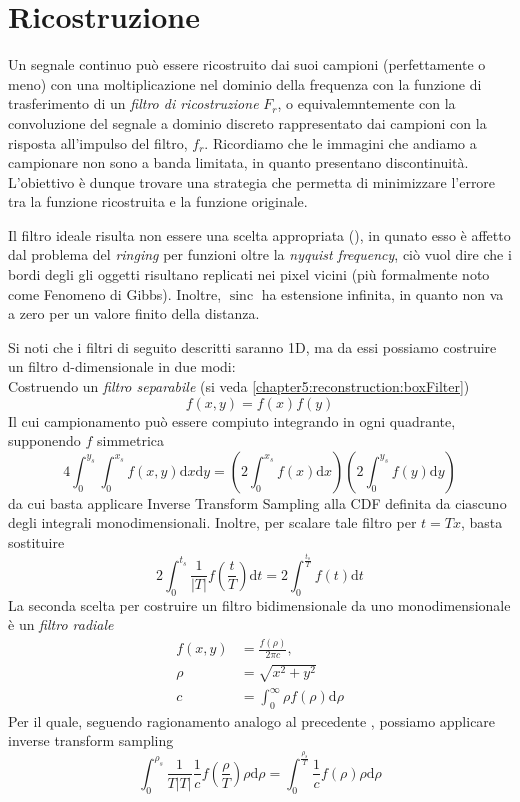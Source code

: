 \section{Ricostruzione}
Un segnale continuo pu\`o essere ricostruito dai suoi campioni (perfettamente o meno) con una moltiplicazione nel dominio della frequenza con la 
funzione di trasferimento di un \textit{filtro di ricostruzione} $F_r$, o equivalemntemente con la convoluzione del segnale a dominio discreto 
rappresentato dai campioni con la risposta all'impulso del filtro, $f_r$. Ricordiamo che le immagini che andiamo a campionare non sono a banda
limitata, in quanto presentano discontinuit\`a. L'obiettivo \`e dunque trovare una strategia che permetta di minimizzare l'errore tra la funzione 
ricostruita e la funzione originale.\par
Il filtro ideale risulta non essere una scelta appropriata (\cite{pharr}), in qunato esso \`e affetto dal problema del \textit{ringing} per funzioni
oltre la \textit{nyquist frequency}, ci\`o vuol dire che i bordi degli gli oggetti risultano replicati nei pixel vicini (pi\`u formalmente noto come 
Fenomeno di Gibbs). Inoltre, $\operatorname{sinc}$ ha estensione infinita, in quanto non va a zero per un valore finito della distanza.\par
Si noti che i filtri di seguito descritti saranno 1D, ma da essi possiamo costruire un filtro d-dimensionale in due modi:\\
Costruendo un \textit{filtro separabile} (si veda \ref{chapter5:reconstruction:boxFilter})
\begin{equation}
	f(x,y)=f(x)f(y)
\end{equation}
Il cui campionamento pu\`o essere compiuto integrando in ogni quadrante, supponendo $f$ simmetrica
\begin{equation}
	4\int_0^{y_s}\int_0^{x_s}f(x,y)\mathrm{d}x\mathrm{d}y = \left(2\int_0^{x_s}f(x)\mathrm{d}x\right)\left(2\int_0^{y_s}f(y)\mathrm{d}y\right)
\end{equation}
da cui basta applicare Inverse Transform Sampling alla CDF definita da ciascuno degli integrali monodimensionali. Inoltre, per scalare tale 
filtro per $t=Tx$, basta sostituire
\begin{equation}
	2\int_0^{t_s}\frac{1}{|T|}f\left(\frac{t}{T}\right)\mathrm{d}t=2\int_0^{\frac{t_s}{T}}f(t)\mathrm{d}t
\end{equation}
La seconda scelta per costruire un filtro bidimensionale da uno monodimensionale \`e un \textit{filtro radiale}
\begin{align}
	f(x,y)&=\frac{f(\rho)}{2\pi c},\\
	\rho &= \sqrt{x^2+y^2}\nonumber\\
	c &= \int_0^{\infty}\rho f(\rho)\mathrm{d}\rho\nonumber
\end{align}
Per il quale, seguendo ragionamento analogo al precedente \cite{pegoraro}, possiamo applicare inverse transform sampling
\begin{equation}
	\int_0^{\rho_s}\frac{1}{T|T|}\frac{1}{c}f\left(\frac{\rho}{T}\right)\rho\mathrm{d}\rho=\int_0^{\frac{\rho_s}{T}}\frac{1}{c}f(\rho)\rho\mathrm{d}\rho
\end{equation}
